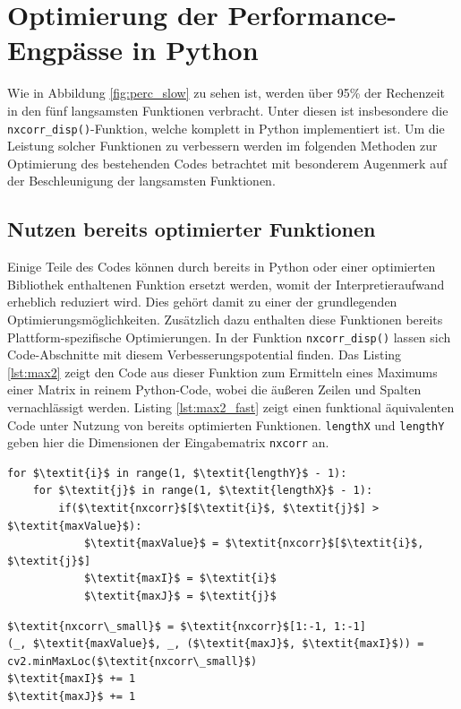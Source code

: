 \section{Optimierung der Performance-Engpässe in Python}

Wie in Abbildung \ref{fig:perc_slow} zu sehen ist, werden über 95\% der Rechenzeit in den fünf langsamsten Funktionen verbracht. Unter diesen ist insbesondere die \texttt{nxcorr\_disp()}-Funktion, welche komplett in Python implementiert ist. Um die Leistung solcher Funktionen zu verbessern werden im folgenden Methoden zur Optimierung des bestehenden Codes betrachtet mit besonderem Augenmerk auf der Beschleunigung der langsamsten Funktionen. 

\subsection{Nutzen bereits optimierter Funktionen}

Einige Teile des Codes können durch bereits in Python oder einer optimierten Bibliothek enthaltenen Funktion ersetzt werden, womit der Interpretieraufwand erheblich reduziert wird. Dies gehört damit zu einer der grundlegenden Optimierungsmöglichkeiten. Zusätzlich dazu enthalten diese Funktionen bereits Plattform-spezifische Optimierungen. In der Funktion \texttt{nxcorr\_disp()} lassen sich Code-Abschnitte mit diesem Verbesserungspotential finden. Das Listing \ref{lst:max2} zeigt den Code aus dieser Funktion zum Ermitteln eines Maximums einer Matrix in reinem Python-Code, wobei die äußeren Zeilen und Spalten vernachlässigt werden. Listing \ref{lst:max2_fast} zeigt einen funktional äquivalenten Code unter Nutzung von bereits optimierten Funktionen. \texttt{lengthX} und \texttt{lengthY} geben hier die Dimensionen der Eingabematrix \texttt{nxcorr} an. 

\begin{lstlisting}[caption={Finden des Maximums einer Matrix}, label={lst:max2}]
for $\textit{i}$ in range(1, $\textit{lengthY}$ - 1):
	for $\textit{j}$ in range(1, $\textit{lengthX}$ - 1):
		if($\textit{nxcorr}$[$\textit{i}$, $\textit{j}$] > $\textit{maxValue}$):
			$\textit{maxValue}$ = $\textit{nxcorr}$[$\textit{i}$, $\textit{j}$]
			$\textit{maxI}$ = $\textit{i}$
			$\textit{maxJ}$ = $\textit{j}$
\end{lstlisting}

\begin{lstlisting}[caption={Finden des Maximums einer Matrix mittels NumPy und OpenCV}, label={lst:max2_fast}]
$\textit{nxcorr\_small}$ = $\textit{nxcorr}$[1:-1, 1:-1]
(_, $\textit{maxValue}$, _, ($\textit{maxJ}$, $\textit{maxI}$)) = cv2.minMaxLoc($\textit{nxcorr\_small}$)
$\textit{maxI}$ += 1
$\textit{maxJ}$ += 1
\end{lstlisting}

